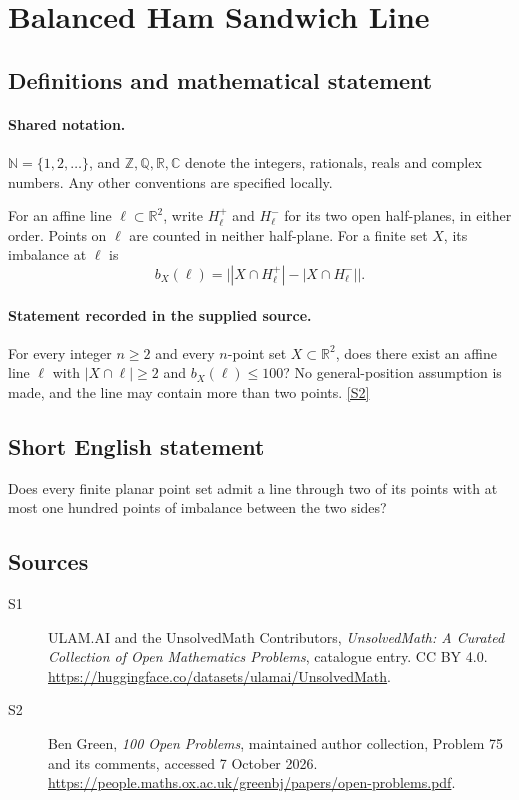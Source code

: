 \documentclass[11pt]{article}
\newcommand{\sref}[2]{\hyperlink{source:#1:#2}{[S#2]}}
\begin{document}
\section{Balanced Ham Sandwich Line}\label{statement}

\subsection{Definitions and mathematical statement}

\paragraph{Shared notation.}$\mathbb N=\{1,2,\ldots\}$, and $\mathbb Z,\mathbb Q,\mathbb R,\mathbb C$ denote the integers, rationals, reals and complex numbers. Any other conventions are specified locally.


For an affine line $\ell\subset\mathbb R^2$, write $H_\ell^+$ and $H_\ell^-$ for its two open half-planes, in either order. Points on $\ell$ are counted in neither half-plane. For a finite set $X$, its imbalance at $\ell$ is
\[
 b_X(\ell)=\bigl||X\cap H_\ell^+|-|X\cap H_\ell^-|\bigr|.
\]
\paragraph{Statement recorded in the supplied source.}
For every integer $n\geq2$ and every $n$-point set $X\subset\mathbb R^2$, does there exist an affine line $\ell$ with $|X\cap\ell|\geq2$ and $b_X(\ell)\leq100$? No general-position assumption is made, and the line may contain more than two points. \sref{statement}{2}
\subsection{Short English statement}
Does every finite planar point set admit a line through two of its points with at most one hundred points of imbalance between the two sides?
\subsection{Sources}
\begin{description}
\item[\hypertarget{source:statement:1}{S1}] ULAM.AI and the UnsolvedMath Contributors, \emph{UnsolvedMath: A Curated Collection of Open Mathematics Problems}, catalogue entry. CC BY 4.0. \url{https://huggingface.co/datasets/ulamai/UnsolvedMath}.
\item[\hypertarget{source:statement:2}{S2}] Ben Green, \emph{100 Open Problems}, maintained author collection, Problem 75 and its comments, accessed 7 October 2026. \url{https://people.maths.ox.ac.uk/greenbj/papers/open-problems.pdf}.
\end{description}
\label{end:statement}
\end{document}
